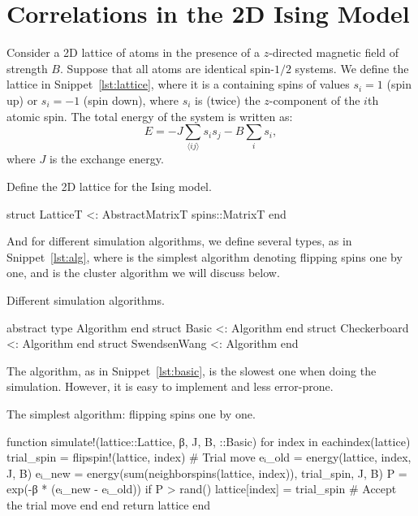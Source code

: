 \section{Correlations in the 2D Ising Model}

Consider a 2D lattice of atoms in the presence of a \(z\)-directed magnetic field of strength
\(B\). Suppose that all atoms are identical spin-\(1/2\) systems.
We define the lattice in Snippet~\ref{lst:lattice},
where it is a  containing spins of values \(s_i = 1\) (spin up) or
\(s_i = -1\) (spin down), where \(s_i\) is (twice) the \(z\)-component of the \(i\)th
atomic spin. The total energy of the system is written as:
%
\begin{equation}
    E = -J \sum_{\langle i j \rangle} s_i s_j - B \sum_{i} s_i,
\end{equation}
%
where \(J\) is the exchange energy.

\begin{algorithm}
    \caption{Define the 2D lattice for the Ising model.}
    \label{lst:lattice}
    \begin{juliacode}
        struct Lattice{T} <: AbstractMatrix{T}
            spins::Matrix{T}
        end
    \end{juliacode}
\end{algorithm}

And for different simulation algorithms, we define several types, as in
Snippet~\ref{lst:alg}, where  is the simplest algorithm
denoting flipping spins one by one, and  is the cluster
algorithm we will discuss below.

\begin{algorithm}
    \caption{Different simulation algorithms.}
    \label{lst:alg}
    \begin{juliacode}
        abstract type Algorithm end
        struct Basic <: Algorithm end
        struct Checkerboard <: Algorithm end
        struct SwendsenWang <: Algorithm end
    \end{juliacode}
\end{algorithm}

The  algorithm, as in Snippet~\ref{lst:basic},
is the slowest one when doing the simulation. However, it is easy to implement
and less error-prone.

\begin{algorithm}
    \caption{The simplest algorithm: flipping spins one by one.}
    \label{lst:basic}
    \begin{juliacode}
        function simulate!(lattice::Lattice, β, J, B, ::Basic)
            for index in eachindex(lattice)
                trial_spin = flipspin!(lattice, index)  # Trial move
                eᵢ_old = energy(lattice, index, J, B)
                eᵢ_new = energy(sum(neighborspins(lattice, index)), trial_spin, J, B)
                P = exp(-β * (eᵢ_new - eᵢ_old))
                if P > rand()
                    lattice[index] = trial_spin  # Accept the trial move
                end
            end
            return lattice
        end
    \end{juliacode}
\end{algorithm}

